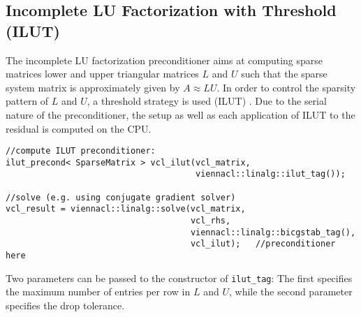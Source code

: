 
\subsection{Incomplete LU Factorization with Threshold (ILUT)}
The incomplete LU factorization preconditioner aims at computing sparse matrices lower and upper triangular matrices $L$ and $U$ such that the sparse system
matrix is approximately given by $A \approx LU$. In order to control the sparsity pattern of $L$ and $U$, a threshold strategy is used (ILUT)
\cite{saad-iterative-solution}. Due to the serial nature of the preconditioner, the setup as well as each application of ILUT to the residual is computed on
the CPU.

\begin{lstlisting}
//compute ILUT preconditioner:
ilut_precond< SparseMatrix > vcl_ilut(vcl_matrix,
                                      viennacl::linalg::ilut_tag());

//solve (e.g. using conjugate gradient solver)
vcl_result = viennacl::linalg::solve(vcl_matrix,
                                     vcl_rhs,
                                     viennacl::linalg::bicgstab_tag(),
                                     vcl_ilut);   //preconditioner here
\end{lstlisting}
Two parameters can be passed to the constructor of \lstinline|ilut_tag|: The first specifies the maximum number of entries per row in $L$ and $U$, while the
second parameter specifies the drop tolerance.


